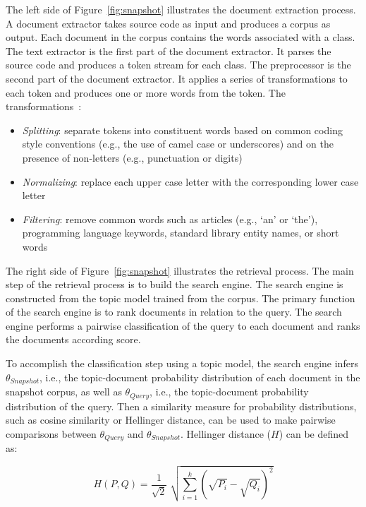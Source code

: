 The left side of Figure~\ref{fig:snapshot} illustrates the document extraction process.
A document extractor takes source code as input and produces a corpus as output.
Each document in the corpus contains the words associated with a class.
The text extractor is the first part of the document extractor.
It parses the source code and produces a token stream for each class.
The preprocessor is the second part of the document extractor.
It applies a series of transformations to each token and
produces one or more words from the token.
The transformations~\cite{Marcus-etal:2004,Marcus-Menzies:2010}: %
\begin{itemize}
    \item {\it Splitting}: separate tokens into constituent words
        based on common coding style conventions (e.g., the use of camel case or underscores)
        and on the presence of non-letters (e.g., punctuation or digits)
    \item {\it Normalizing}: replace each upper case letter with the corresponding
        lower case letter
    \item {\it Filtering}: remove common words such as articles (e.g., `an' or `the'),
        programming language keywords, standard library entity names, or short words
\end{itemize}

The right side of Figure~\ref{fig:snapshot} illustrates the retrieval process.
The main step of the retrieval process is to build the search engine.
The search engine is constructed from the topic model trained from the corpus.
The primary function of the search engine is to rank documents in relation to the query.
The search engine performs a pairwise classification of the query
to each document and ranks the documents according score.

To accomplish the classification step using a topic model,
the search engine infers $\theta_{Snapshot}$, i.e.,
the topic-document probability distribution of each document in the snapshot corpus,
as well as $\theta_{Query}$, i.e., the topic-document probability distribution  of the query.
Then a similarity measure for probability distributions, such as 
cosine similarity or Hellinger distance, can be used to make pairwise comparisons
between $\theta_{Query}$ and $\theta_{Snapshot}$.
Hellinger distance ($H$) can be defined as:

\begin{equation}
    H(P, Q) = \frac{1}{\sqrt{2}} \; \sqrt{\sum_{i=1}^{k} (\sqrt{P_i} - \sqrt{Q_i})^2}
\end{equation}

